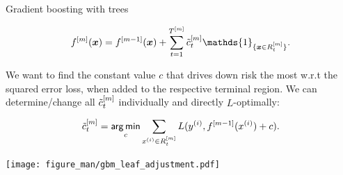 \begin{vbframe}{Gradient boosting with trees}
\begin{footnotesize}
$$
\fm(\xv) = \fmd(\xv) +  \sum_{t=1}^{\Tm} \ctmt \mathds{1}_{\{\xv \in \Rtm\}}. 
$$

We want to find the constant value $c$ that drives down risk the most w.r.t the squared error loss,
when added to the respective terminal region.
We can determine/change all $\tilde{c}_t^{[m]}$ individually and directly $L$-optimally:



$$ \tilde{c}_t^{[m]} = \mathop{\sf arg\,min}_{c} \sum_{x^{(i)} \in R_{t}^{[m]}} L(y^{(i)}, f^{[m-1]}(x^{(i)}) + c). $$

\vspace{-0.5cm}

\begin{center}

\texttt{[image: figure\_man/gbm\_leaf\_adjustment.pdf]}

\end{center}

\end{footnotesize}

\framebreak




\end{vbframe}


